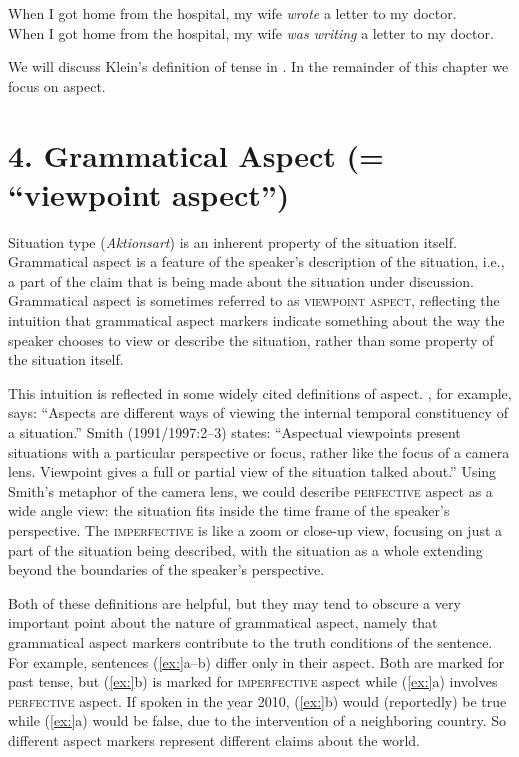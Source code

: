 \ea
\ea When I got home from the hospital, my wife \textit{wrote} a letter to my doctor.\\
\ex When I got home from the hospital, my wife \textit{was writing} a letter to my doctor.
                       \z
\z


We will discuss Klein’s definition of tense in . In the remainder of this chapter we focus on aspect.


\section{4. Grammatical Aspect (= “viewpoint aspect”)}\label{sec:} 

Situation type (\textit{Aktionsart}) is an inherent property of the situation itself. Grammatical aspect is a feature of the speaker’s description of the situation, i.e., a part of the claim that is being made about the situation under discussion. Grammatical aspect is sometimes referred to as \textsc{viewpoint aspect}, reflecting the intuition that grammatical aspect markers indicate something about the way the speaker chooses to view or describe the situation, rather than some property of the situation itself.



This intuition is reflected in some widely cited definitions of aspect. \citet[3]{Comrie1976}, for example, says: “Aspects are different ways of viewing the internal temporal constituency of a situation.” Smith (1991/1997:2–3) states: “Aspectual viewpoints present situations with a particular perspective or focus, rather like the focus of a camera lens. Viewpoint gives a full or partial view of the situation talked about.” Using Smith’s metaphor of the camera lens, we could describe \textsc{perfective} aspect as a wide angle view: the situation fits inside the time frame of the speaker’s perspective. The \textsc{imperfective} is like a zoom or close-up view, focusing on just a part of the situation being described, with the situation as a whole extending beyond the boundaries of the speaker’s perspective.



Both of these definitions are helpful, but they may tend to obscure a very important point about the nature of grammatical aspect, namely that grammatical aspect markers contribute to the truth conditions of the sentence. For example, sentences (\ref{ex:}a--b) differ only in their aspect. Both are marked for past tense, but (\ref{ex:}b) is marked for \textsc{imperfective} aspect while (\ref{ex:}a) involves \textsc{perfective} aspect. If spoken in the year 2010, (\ref{ex:}b) would (reportedly) be true while (\ref{ex:}a) would be false, due to the intervention of a neighboring country. So different aspect markers represent different claims about the world.


